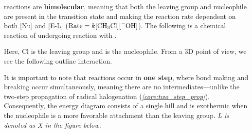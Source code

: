 \documentclass[10pt]{article}
\begin{document}
    \begin{core}{\snt}
      
      \snt reactions are \textbf{bimolecular}, meaning that both the leaving group and nucleophile are present in the transition state and making the reaction rate dependent on both [Nu] and [E-L] ($\text{Rate} = k[\ce{CH3Cl}][\ce{^-OH}]$). The following is a chemical reaction of  undergoing \snt reaction with .

      \vspace{15pt}

      Here, Cl is the leaving group and  is the nucleophile. From a 3D point of view, we see the following outline interaction.


      It is important to note that \snt reactions occur in \textbf{one step}, where bond making and breaking occur simultaneously, meaning there are no intermediates---unlike the two-step propagation of radical halogenation (\textit{\autoref{core:two_step_prop}}). Consequently, the energy diagram consists of a single hill and is exothermic when the nucleophile is a more favorable attachment than the leaving group. \textit{L is denoted as X in the figure below.}


\end{core}
\end{document}
